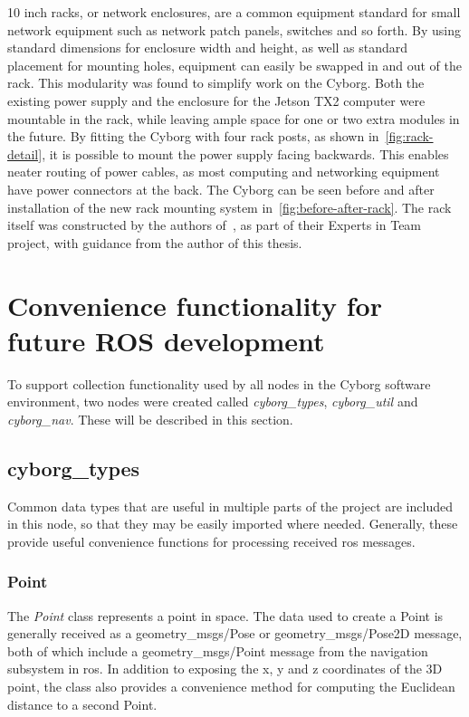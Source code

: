 \documentclass[\rootfolder/main.tex]{subfiles}
\begin{document}
10 inch racks, or network enclosures, are a common equipment standard for small network equipment such as network patch panels, switches and so forth.
By using standard dimensions for enclosure width and height, as well as standard placement for mounting holes, equipment can easily be swapped in and out of the rack.
This modularity was found to simplify work on the Cyborg. 
Both the existing power supply and the enclosure for the Jetson TX2 computer were mountable in the rack, while leaving ample space for one or two extra modules in the future.
By fitting the Cyborg with four rack posts, as shown in~\cref{fig:rack-detail}, it is possible to mount the power supply facing backwards.
This enables neater routing of power cables, as most computing and networking equipment have power connectors at the back.
The Cyborg can be seen before and after installation of the new rack mounting system in~\cref{fig:before-after-rack}.
The rack itself was constructed by the authors of~\cite{Johansen2018}, as part of their Experts in Team project, with guidance from the author of this thesis.

\section{Convenience functionality for future ROS development}

To support collection functionality used by all nodes in the Cyborg software environment, two nodes were created called \emph{cyborg\_types}, \emph{cyborg\_util} and \emph{cyborg\_nav}.
These will be described in this section.

\subsection{cyborg\_types}

Common data types that are useful in multiple parts of the project are included in this node, so that they may be easily imported where needed.
Generally, these provide useful convenience functions for processing received \acrshort{ros} messages.

\subsubsection{Point}

The \emph{Point} class represents a point in space.
The data used to create a Point is generally received as a geometry\_msgs/Pose or geometry\_msgs/Pose2D message, both of which include a geometry\_msgs/Point message from the navigation subsystem in \acrshort{ros}.
In addition to exposing the x, y and z coordinates of the 3D point, the class also provides a convenience method for computing the Euclidean distance to a second Point.
\end{document}
